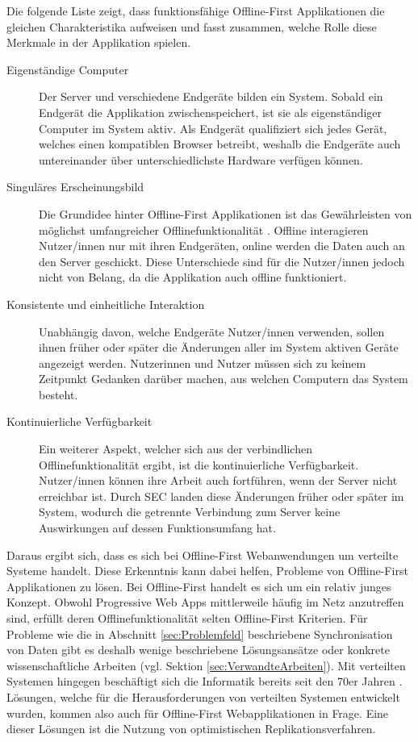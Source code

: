 \documentclass[a4paper, 12pt]{scrreprt}
\begin{document}
Die folgende Liste zeigt, dass funktionsfähige Offline-First Applikationen die gleichen Charakteristika aufweisen und fasst zusammen, welche Rolle diese Merkmale in der Applikation spielen.

\begin{description}		
\item[Eigenständige Computer] Der Server und verschiedene Endgeräte bilden ein System. Sobald ein Endgerät die Applikation zwischenspeichert, ist sie als eigenständiger Computer im System aktiv. Als Endgerät qualifiziert sich jedes Gerät, welches einen kompatiblen Browser betreibt, weshalb die Endgeräte auch untereinander über unterschiedlichste Hardware verfügen können.
\item[Singuläres Erscheinungsbild]Die Grundidee hinter Offline-First Applikationen ist das Gewährleisten von möglichst umfangreicher Offlinefunktionalität \autocite{OnlineGoogleOfflineFirst}. Offline interagieren Nutzer/innen nur mit ihren Endgeräten, online werden die Daten auch an den Server geschickt. Diese Unterschiede sind für die Nutzer/innen jedoch nicht von Belang, da die Applikation auch offline funktioniert. \item[Konsistente und einheitliche Interaktion]
Unabhängig davon, welche Endgeräte Nutzer/innen verwenden, sollen ihnen früher oder später die Änderungen aller im System aktiven Geräte angezeigt werden. Nutzerinnen und Nutzer müssen sich zu keinem Zeitpunkt Gedanken darüber machen, aus welchen Computern das System besteht.
\item[Kontinuierliche Verfügbarkeit]
Ein weiterer Aspekt, welcher sich aus der verbindlichen Offlinefunktionalität ergibt, ist die kontinuierliche Verfügbarkeit. Nutzer/innen können ihre Arbeit auch fortführen, wenn der Server nicht erreichbar ist. Durch SEC landen diese Änderungen früher oder später im System, wodurch die getrennte Verbindung zum Server keine Auswirkungen auf dessen Funktionsumfang hat. 
\end{description}
\label{tab:charakteristikaOfflineFirst}

Daraus ergibt sich, dass es sich bei Offline-First Webanwendungen um verteilte Systeme handelt. Diese Erkenntnis kann dabei helfen, Probleme von Offline-First Applikationen zu lösen. Bei Offline-First handelt es sich um ein relativ junges Konzept. Obwohl Progressive Web Apps mittlerweile häufig im Netz anzutreffen sind, erfüllt deren Offlinefunktionalität selten Offline-First Kriterien. Für Probleme wie die in Abschnitt \ref{sec:Problemfeld} beschriebene Synchronisation von Daten gibt es deshalb wenige beschriebene Lösungsansätze oder konkrete wissenschaftliche Arbeiten (vgl. Sektion \ref{sec:VerwandteArbeiten}). Mit verteilten Systemen hingegen beschäftigt sich die Informatik bereits seit den 70er Jahren \autocite{Andrews1999FoundationsOM}. Lösungen, welche für die Herausforderungen von verteilten Systemen entwickelt wurden, kommen also auch für Offline-First Webapplikationen in Frage. Eine dieser Lösungen ist die Nutzung von optimistischen Replikationsverfahren. 
\end{document}

